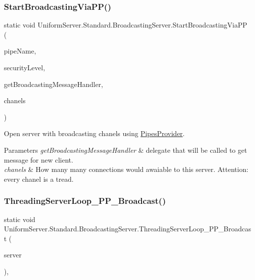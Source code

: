 \subsubsection{\texorpdfstring{Start\+Broadcasting\+Via\+P\+P()}{StartBroadcastingViaPP()}}
{\footnotesize\ttfamily static void Uniform\+Server.\+Standard.\+Broadcasting\+Server.\+Start\+Broadcasting\+Via\+PP (\begin{DoxyParamCaption}\item[{string}]{pipe\+Name,  }\item[{\mbox{\hyperlink{namespace_pipes_provider_1_1_security_a1a6020eca1c661a6f7140e8260502d7e}{Pipes\+Provider.\+Security.\+Security\+Level}}}]{security\+Level,  }\item[{Broadcasting\+Server\+Transmission\+Controller.\+Message\+Handeler}]{get\+Broadcasting\+Message\+Handler,  }\item[{int}]{chanels }\end{DoxyParamCaption})\hspace{0.3cm}{\ttfamily [static]}}



Open server with broadcasting chanels using \mbox{\hyperlink{namespace_pipes_provider}{Pipes\+Provider}}. 


\begin{DoxyParams}{Parameters}
{\em get\+Broadcasting\+Message\+Handler} & delegate that will be called to get message for new client.\\
\hline
{\em chanels} & How many many connections would awaiable to this server. Attention\+: every chanel is a tread.\\
\hline
\end{DoxyParams}
\mbox{\label{class_uniform_server_1_1_standard_1_1_broadcasting_server_af0b6354f992b05477ddbbead9a3b2250}} 
\subsubsection{\texorpdfstring{Threading\+Server\+Loop\+\_\+\+P\+P\+\_\+\+Broadcast()}{ThreadingServerLoop\_PP\_Broadcast()}}
{\footnotesize\ttfamily static void Uniform\+Server.\+Standard.\+Broadcasting\+Server.\+Threading\+Server\+Loop\+\_\+\+P\+P\+\_\+\+Broadcast (\begin{DoxyParamCaption}\item[{object}]{server }\end{DoxyParamCaption})\hspace{0.3cm}{\ttfamily [static]}, {\ttfamily [protected]}}



